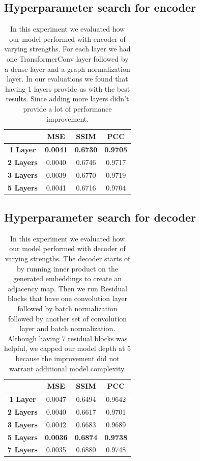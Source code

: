 \subsection{Hyperparameter search for encoder}

\begin{table}[H]
\centering
\begin{tabular}{cccc}
\hline
                  & \textbf{MSE}    & \textbf{SSIM}   & \textbf{PCC}    \\ \hline
\textbf{1 Layer}  & \textbf{0.0041}          & \textbf{0.6730}          & \textbf{0.9705}          \\
\textbf{2 Layers} & 0.0040          & 0.6746          & 0.9717          \\
\textbf{3 Layers} & 0.0039 & 0.6770 & 0.9719 \\
\textbf{5 Layers} & 0.0041          & 0.6716          & 0.9704          \\ \hline
\end{tabular}
\caption{
    \label{supp-tab:encoder-depth-eval} In this experiment we evaluated how our model performed with encoder of varying strengths. For each layer we had one TransformerConv layer followed by a dense layer and a graph normalization layer. In our evaluations we found that having 1 layers provide us with the best results. Since adding more layers didn't provide a lot of performance improvement. 
}
\end{table}

\subsection{Hyperparameter search for decoder}

\begin{table}[H]
\centering
\begin{tabular}{cccc}
\hline
                  & \textbf{MSE}    & \textbf{SSIM}   & \textbf{PCC}    \\ \hline
\textbf{1 Layer}  & 0.0047          & 0.6494          & 0.9642          \\
\textbf{2 Layers} & 0.0040          & 0.6617          & 0.9701          \\
\textbf{3 Layers} & 0.0042          & 0.6683          & 0.9689          \\
\textbf{5 Layers} & \textbf{0.0036} & \textbf{0.6874} & \textbf{0.9738} \\
\textbf{7 Layers} & 0.0035          & 0.6880          & 0.9748          \\ \hline
\end{tabular}
\caption{
    \label{supp-tab:decoder-depth-eval} In this experiment we evaluated how our model performed with decoder of varying strengths. The decoder starts of by running inner product on the generated embeddings to create an adjacency map. Then we run Residual blocks that have one convolution layer followed by batch normalization followed by another set of convolution layer and batch normalization. Although having 7 residual blocks was helpful, we capped our model depth at 5 because the improvement did not warrant additional model complexity. 
}
\end{table}

